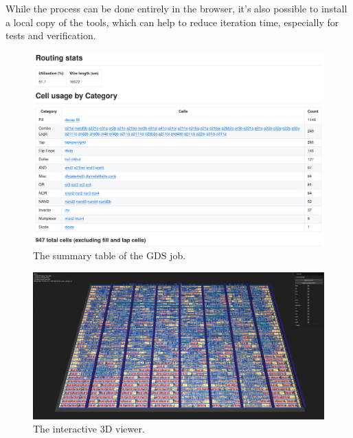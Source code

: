 While the process can be done entirely in the browser, it’s also possible to install a local copy of the tools\cite{localinstall}, which can help to reduce iteration time, especially for tests and verification.

\begin{figure}[!t]
\centering
\includegraphics[width=\columnwidth]{./Figs/gh action cell stats.png}
\caption{The summary table of the GDS job.}
\label{fig:summary_table_GDS_job}
\end{figure}

\begin{figure}[!t]
\centering
\includegraphics[width=\columnwidth]{./Figs/gh action gds 3d view.png}
\caption{The interactive 3D viewer.}
\label{fig:interactive_3D_viewer}
\end{figure}
